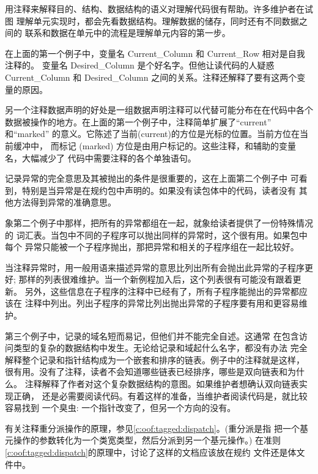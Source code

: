 \begin{blockindent}
用注释来解释目的、结构、数据结构的语义对理解代码很有帮助。许多维护者在试图
理解单元实现时，都会先看数据结构。理解数据的储存，同时还有不同数据之间的
联系和数据在单元中的流程是理解单元内容的第一步。

在上面的第一个例子中，变量名 Current\_Column 和 Current\_Row 相对是自我注释的。
变量名 Desired\_Column 是个好名字。但他让读代码的人疑惑 Current\_Column 和
Desired\_Column 之间的关系。注释还解释了要有这两个变量的原因。

另一个注释数据声明的好处是一组数据声明注释可以代替可能分布在在代码中各个
数据被操作的地方。在上面的第一个例子中，注释简单扩展了``current'' 和``marked''
的意义。它陈述了当前(current)的方位是光标的位置。当前方位在当前缓冲中，
而标记 (marked) 方位是由用户标记的。这些注释，和辅助的变量名，大幅减少了
代码中需要注释的各个单独语句。

记录异常的完全意思及其被抛出的条件是很重要的，这在上面第二个例子中
可看到，特别是当异常是在规约包中声明的。如果没有读包体中的代码，读者没有
其他方法得到异常的准确意思。

象第二个例子中那样，把所有的异常都组在一起，就象给读者提供了一份特殊情况的
词汇表。当包中不同的子程序可以抛出同样的异常时，这个很有用。如果包中每个
异常只能被一个子程序抛出，那把异常和相关的子程序组在一起比较好。

当注释异常时，用一般用语来描述异常的意思比列出所有会抛出此异常的子程序更好;
那样的列表很难维护。当一个新例程加入后，这个列表很有可能没有跟着更新。
另外，这些信息在子程序的注释中已经有了，所有子程序能抛出的异常都应该在
注释中列出。列出子程序的异常比列出抛出异常的子程序要有用和更容易维护。

第三个例子中，记录的域名短而易记，但他们并不能完全自述。这通常
在包含访问类型的复杂的数据结构中发生。无论给记录和域起什么名字，都没有办法
完全解释整个记录和指针结构成为一个嵌套和排序的链表。例子中的注释就是这样，
很有用。没有了注释，读者不会知道哪些链表已经排序，哪些是双向链表和为什么。
注释解释了作者对这个复杂数据结构的意图。如果维护者想确认双向链表实现正确，
还是必需要阅读代码。有着这样的准备，当维护者阅读代码是，就比较容易找到
一个臭虫: 一个指针改变了，但另一个方向的没有。

有关注释重分派操作的原理，参见\ref{c:oof:tagged:dispatch}。(重分派是指
把一个基元操作的参数转化为一个类宽类型，然后分派到另一个基元操作。) 
在准则\ref{c:oof:tagged:dispatch}的原理中，讨论了这样的文档应该放在规约
文件还是体文件中。
\end{blockindent}

